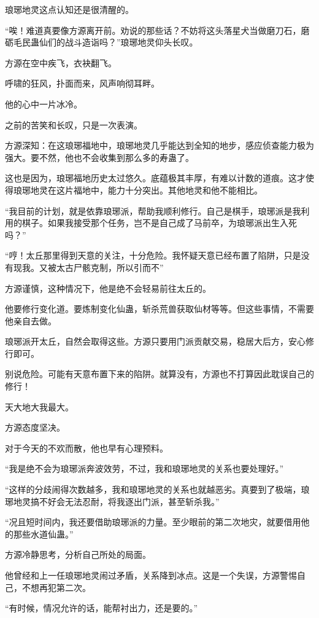 \begin{this_body}
琅琊地灵这点认知还是很清醒的。

“唉！难道真要像方源离开前。劝说的那些话？不妨将这头落星犬当做磨刀石，磨砺毛民蛊仙们的战斗造诣吗？”琅琊地灵仰头长叹。

方源在空中疾飞，衣袂翻飞。

呼啸的狂风，扑面而来，风声响彻耳畔。

他的心中一片冰冷。

之前的苦笑和长叹，只是一次表演。

方源深知：在这琅琊福地中，琅琊地灵几乎能达到全知的地步，感应侦查能力极为强大。要不然，他也不会收集到那么多的寿蛊了。

这也是因为，琅琊福地历史太过悠久。底蕴极其丰厚，有难以计数的道痕。这才使得琅琊地灵在这片福地中，能力十分突出。其他地灵和他不能相比。

“我目前的计划，就是依靠琅琊派，帮助我顺利修行。自己是棋手，琅琊派是我利用的棋子。如果我接受那个任务，岂不是自己成了马前卒，为琅琊派出生入死吗？”

“哼！太丘那里得到天意的关注，十分危险。我怀疑天意已经布置了陷阱，只是没有现我。又被太古尸骸克制，所以引而不”

方源谨慎，这种情况下，他是绝不会轻易前往太丘的。

他要修行变化道。要炼制变化仙蛊，斩杀荒兽获取仙材等等。但这些事情，不需要他亲自去做。

琅琊派开太丘，自然会取得这些。方源只要用门派贡献交易，稳居大后方，安心修行即可。

别说危险。可能有天意布置下来的陷阱。就算没有，方源也不打算因此耽误自己的修行！

天大地大我最大。

方源态度坚决。

对于今天的不欢而散，他也早有心理预料。

“我是绝不会为琅琊派奔波效劳，不过，我和琅琊地灵的关系也要处理好。”

“这样的分歧闹得次数越多，我和琅琊地灵的关系也就越恶劣。真要到了极端，琅琊地灵搞不好会无法忍耐，将我逐出门派，甚至斩杀我。”

“况且短时间内，我还要借助琅琊派的力量。至少眼前的第二次地灾，就要借用他的那些水道仙蛊。”

方源冷静思考，分析自己所处的局面。

他曾经和上一任琅琊地灵闹过矛盾，关系降到冰点。这是一个失误，方源警惕自己，不想再犯第二次。

“有时候，情况允许的话，能帮衬出力，还是要的。”


\end{this_body}
